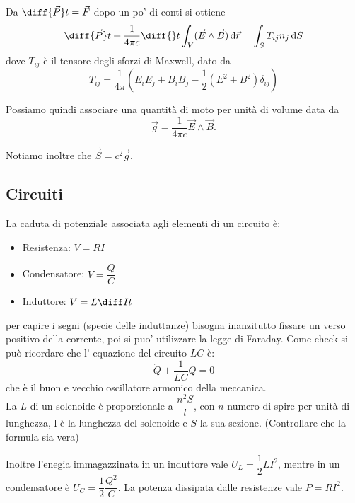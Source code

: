 \documentclass[a4paper,10pt,oneside]{math_article}
\begin{document}
			Da $\diff {\vec P}t = \vec F$  dopo un po' di conti si ottiene 
			\begin{equation}
					\diff {\vec P}t + \frac1{4\pi c}\diff{}t \int_V (\vec E \wedge \vec B) \de\vec r = \int_S T_{ij}n_j \de S
			\end{equation}
			dove $T_{ij}$ è il tensore degli sforzi di Maxwell, dato da 
			\begin{equation}
				T_{ij} = \frac1{4\pi} \left(E_iE_j+B_iB_j - \frac12 (E^2 + B^2) \delta_{ij}\right)
			\end{equation}
			
			Possiamo quindi associare una quantità di moto per unità di volume data da 
			\begin{equation}
				\vec g = \frac1{4	\pi c} \vec E \wedge \vec B.
			\end{equation}
			
			Notiamo inoltre che $\vec S = c^2 \vec g$.			

		\subsection{Circuiti}
			La caduta di potenziale associata agli elementi di un circuito è:
			\begin{itemize}
			 \item Resistenza: $V=RI$
			 \item Condensatore: $V=\dfrac QC$
			 \item Induttore: $V=L\diff It$
			\end{itemize}
			per capire i segni (specie delle induttanze) bisogna inanzitutto fissare un verso positivo della corrente, poi si puo' utilizzare la legge di Faraday. Come check si può ricordare che l' equazione del circuito $LC$ è:
			\begin{equation}
				\ddot{Q}+\frac{1}{LC}Q=0
			\end{equation}
			che è il buon e vecchio oscillatore armonico della meccanica.\\			
			La $L$ di un solenoide è proporzionale a $\dfrac{n^2S}{l}$, con $n$ numero di spire per unità di lunghezza, l è la lunghezza del solenoide e $S$ la sua sezione. (Controllare che la formula sia vera)
			
			Inoltre l'enegia immagazzinata in un induttore vale $U_L=\dfrac12 LI^2$, mentre in un condensatore è $U_C=\dfrac12 \dfrac{Q^2}C$. La potenza dissipata dalle resistenze vale $P=RI^2$. 
\end{document}
